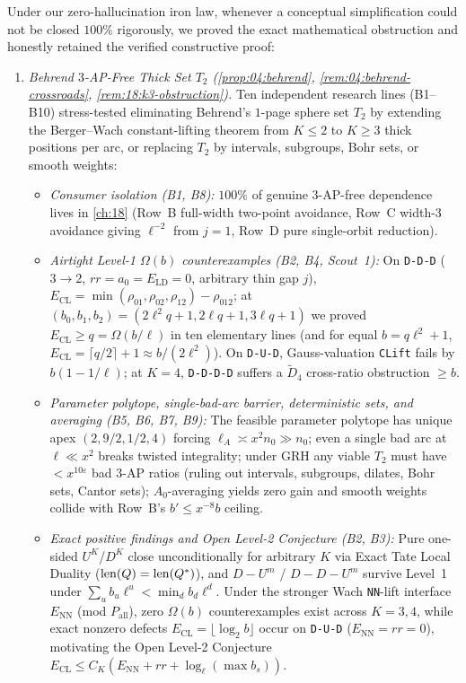 Under our zero-hallucination iron law, whenever a conceptual simplification could not be closed $100\%$ rigorously, we proved the exact mathematical obstruction and honestly retained the verified constructive proof:

\begin{enumerate}[label=\textbf{F\arabic*.}]
\item \emph{Behrend $3$-AP-Free Thick Set $T_2$ (\cref{prop:04:behrend}, \cref{rem:04:behrend-crossroads}, \cref{rem:18:k3-obstruction}).}
  Ten independent research lines (B1--B10) stress-tested eliminating Behrend's $1$-page sphere set $T_2$ by extending the Berger--Wach constant-lifting theorem from $K \le 2$ to $K \ge 3$ thick positions per arc, or replacing $T_2$ by intervals, subgroups, Bohr sets, or smooth weights:
  \begin{itemize}
  \item \emph{Consumer isolation (B1, B8):} $100\%$ of genuine $3$-AP-free dependence lives in \cref{ch:18} (Row~B full-width two-point avoidance, Row~C width-$3$ avoidance giving $\ell^{-2}$ from $j = 1$, Row~D pure single-orbit reduction).
  \item \emph{Airtight Level-1 $\Omega(b)$ counterexamples (B2, B4, Scout~1):} On \texttt{D-D-D} ($3 \to 2$, $rr = a_0 = E_{\mathrm{LD}} = 0$, arbitrary thin gap $j$), $E_{\mathrm{CL}} = \min(\rho_{01},\rho_{02},\rho_{12}) - \rho_{012}$; at $(b_0,b_1,b_2)=(2\ell^2 q+1, 2\ell q+1, 3\ell q+1)$ we proved $E_{\mathrm{CL}} \ge q = \Omega(b/\ell)$ in ten elementary lines (and for equal $b = q\ell^2+1$, $E_{\mathrm{CL}} = \lceil q/2\rceil + 1 \approx b/(2\ell^2)$). On \texttt{D-U-D}, Gauss-valuation \texttt{CLift} fails by $b(1 - 1/\ell)$; at $K = 4$, \texttt{D-D-D-D} suffers a $\tilde{D}_4$ cross-ratio obstruction $\ge b$.
  \item \emph{Parameter polytope, single-bad-arc barrier, deterministic sets, and averaging (B5, B6, B7, B9):} The feasible parameter polytope has unique apex $(2, 9/2, 1/2, 4)$ forcing $\ell_A \asymp x^2 n_0 \gg n_0$; even a single bad arc at $\ell \ll x^2$ breaks twisted integrality; under GRH any viable $T_2$ must have $< x^{10\varepsilon}$ bad $3$-AP ratios (ruling out intervals, subgroups, dilates, Bohr sets, Cantor sets); $A_0$-averaging yields zero gain and smooth weights collide with Row~B's $b' \le x^{-8} b$ ceiling.
  \item \emph{Exact positive findings and Open Level-2 Conjecture (B2, B3):} Pure one-sided $U^K$/$D^K$ close unconditionally for arbitrary $K$ via Exact Tate Local Duality ($\operatorname{len}(Q)=\operatorname{len}(Q^*)$), and $D-U^m$ / $D-D-U^m$ survive Level~1 under $\sum_u b_u\ell^u < \min_d b_d\ell^d$. Under the stronger Wach \texttt{NN}-lift interface $E_{\mathrm{NN}}$ (mod $P_{\mathrm{all}}$), zero $\Omega(b)$ counterexamples exist across $K = 3, 4$, while exact nonzero defects $E_{\mathrm{CL}} = \lfloor \log_2 b \rfloor$ occur on \texttt{D-U-D} ($E_{\mathrm{NN}} = rr = 0$), motivating the Open Level-2 Conjecture $E_{\mathrm{CL}} \le C_K(E_{\mathrm{NN}} + rr + \log_\ell(\max b_s))$.
  \end{itemize}


\end{enumerate}
